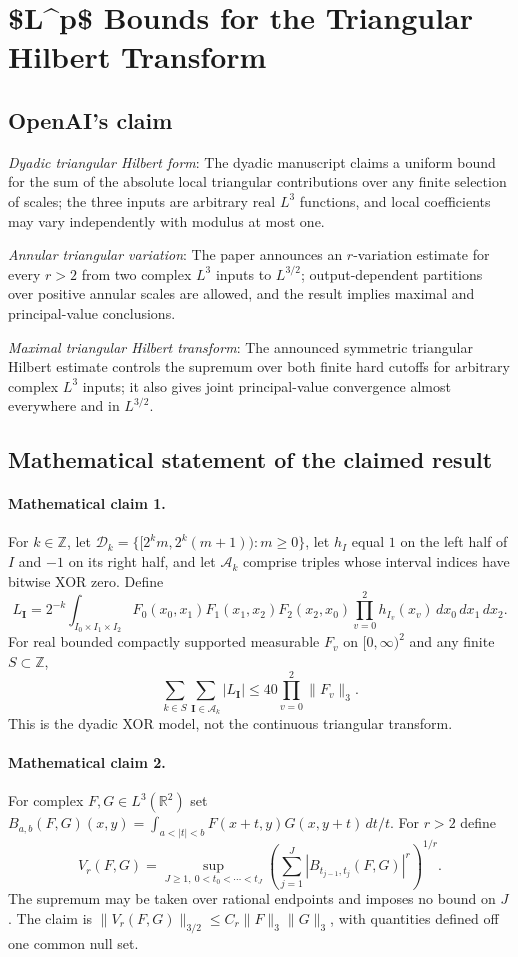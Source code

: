 \documentclass[11pt]{article}
\begin{document}
\section*{\$L\textasciicircum{}p\$ Bounds for the Triangular Hilbert Transform}

\subsection{OpenAI's claim}
\textit{Dyadic triangular Hilbert form}: The dyadic manuscript claims a uniform bound for the sum of the absolute local triangular contributions over any finite selection of scales; the three inputs are arbitrary real $L^3$ functions, and local coefficients may vary independently with modulus at most one.

\textit{Annular triangular variation}: The paper announces an $r$-variation estimate for every $r>2$ from two complex $L^3$ inputs to $L^{3/2}$; output-dependent partitions over positive annular scales are allowed, and the result implies maximal and principal-value conclusions.

\textit{Maximal triangular Hilbert transform}: The announced symmetric triangular Hilbert estimate controls the supremum over both finite hard cutoffs for arbitrary complex $L^3$ inputs; it also gives joint principal-value convergence almost everywhere and in $L^{3/2}$.

\subsection{Mathematical statement of the claimed result}
\paragraph{Mathematical claim 1.} For $k\in\mathbb Z$, let $\mathcal D_k=\{[2^km,2^k(m+1)):m\ge0\}$, let $h_I$ equal $1$ on the left half of $I$ and $-1$ on its right half, and let $\mathcal A_k$ comprise triples whose interval indices have bitwise XOR zero. Define \[L_{\mathbf I}=2^{-k}\int_{I_0\times I_1\times I_2}F_0(x_0,x_1)F_1(x_1,x_2)F_2(x_2,x_0)\prod_{v=0}^2h_{I_v}(x_v)\,dx_0\,dx_1\,dx_2.\] For real bounded compactly supported measurable $F_v$ on $[0,\infty)^2$ and any finite $S\subset\mathbb Z$, \[\sum_{k\in S}\sum_{\mathbf I\in\mathcal A_k}|L_{\mathbf I}|\le40\prod_{v=0}^2\|F_v\|_3.\] This is the dyadic XOR model, not the continuous triangular transform.

\paragraph{Mathematical claim 2.} For complex $F,G\in L^3(\mathbb R^2)$ set $B_{a,b}(F,G)(x,y)=\int_{a<|t|<b}F(x+t,y)G(x,y+t)\,dt/t$. For $r>2$ define \[V_r(F,G)=\sup_{J\ge1,\ 0<t_0<\cdots<t_J}\left(\sum_{j=1}^J|B_{t_{j-1},t_j}(F,G)|^r\right)^{1/r}.\] The supremum may be taken over rational endpoints and imposes no bound on $J$. The claim is $\|V_r(F,G)\|_{3/2}\le C_r\|F\|_3\|G\|_3$, with quantities defined off one common null set.
\end{document}
